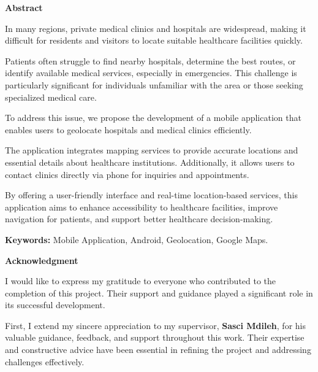 \documentclass[12pt]{report}
\begin{document}
\tableofcontents
\newpage
\begin{center}
	\textbf{Abstract} \\
	\vspace*{0.3cm}
\end{center}
\noindent In many regions, private medical clinics and hospitals are widespread, making it difficult for residents and visitors to locate suitable healthcare facilities quickly.

\noindent Patients often struggle to find nearby hospitals, determine the best routes, or identify available medical services, especially in emergencies. This challenge is particularly significant for individuals unfamiliar with the area or those seeking specialized medical care.

\noindent To address this issue, we propose the development of a mobile application that enables users to geolocate hospitals and medical clinics efficiently.
\vspace*{0.5cm}

\noindent The application integrates mapping services to provide accurate locations and essential details about healthcare institutions. Additionally, it allows users to contact clinics directly via phone for inquiries and appointments. \vspace*{0.5cm}

\noindent By offering a user-friendly interface and real-time location-based services, this application aims to enhance accessibility to healthcare facilities, improve navigation for patients, and support better healthcare decision-making.  \vspace*{0.5cm}


\noindent \vspace*{0.5cm}\textbf{Keywords:} Mobile Application, Android, Geolocation, Google Maps.
\newpage
\begin{center}
	\textbf{Acknowledgment} \\
	\vspace*{0.3cm}
\end{center}

\noindent I would like to express my gratitude to everyone who contributed to the completion of this project. Their support and guidance played a significant role in its successful development.  \vspace*{0.5cm}

\noindent First, I extend my sincere appreciation to my supervisor, \textbf{Sasci Mdileh}, for his valuable guidance, feedback, and support throughout this work. Their expertise and constructive advice have been essential in refining the project and addressing challenges effectively.
\end{document}
